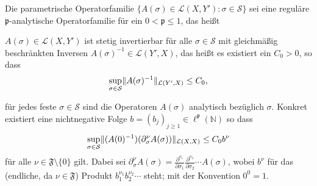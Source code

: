 \begin{Annahme}
    \label{thm:kunoth:assumption1}
    Die parametrische Operatorfamilie
    $\{ A(\sigma) \in \mathcal L(X, Y') : \sigma \in \mathcal S\}$ sei eine reguläre $\mathfrak p$-analytische Operatorfamilie für ein $0 < \mathfrak p \leq 1$, das heißt
    \begin{thmenumerate}
        \item $A(\sigma) \in \mathcal L(X, Y')$ ist stetig invertierbar für alle $\sigma \in \mathcal S$ mit gleichmäßig beschränkten Inversen $A(\sigma)^{-1} \in \mathcal L(Y', X)$, das heißt es existiert ein $C_{0} > 0$, so dass
        \begin{equation}
            \sup_{\sigma \in \mathcal S} \lVert A(\sigma)^{-1}\rVert_{\mathcal L(Y', X)} \leq C_{0},
        \end{equation}
        \item für jedes feste $\sigma \in \mathcal S$ sind die Operatoren $A(\sigma)$ analytisch bezüglich $\sigma$. Konkret existiert eine nichtnegative Folge $b = (b_{j})_{j \geq 1} \in \ell^{\mathfrak p}(\mathbb{N})$ so dass
        \begin{equation}
            \sup_{\sigma \in \mathcal S} \lVert(A(0)^{-1})(\partial^{\nu}_{\sigma} A(\sigma))\rVert_{\mathcal L(X, X)} \leq C_{0} b^{\nu}
        \end{equation}
        für alle $\nu \in \mathfrak F \setminus \{ 0 \}$ gilt.
        Dabei sei $\partial^{\nu}_{\sigma} A(\sigma) = \frac{\partial^{\nu_{1}}}{\partial \sigma_{1}} \frac{\partial^{\nu_{2}}}{\partial \sigma_{2}} \cdots A(\sigma)$, wobei $b^{\nu}$ für das (endliche, da $\nu \in \mathfrak F$) Produkt $b_{1}^{\nu_{1}} b_{2}^{\nu_{2}} \cdots$ steht; mit der Konvention $0^{0} = 1$.
    \end{thmenumerate}
\end{Annahme}

